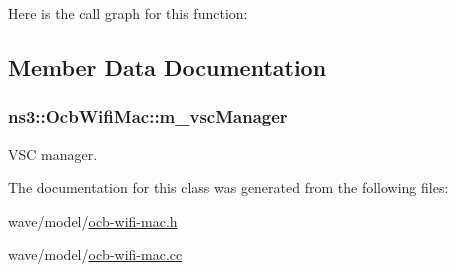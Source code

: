 Here is the call graph for this function\+:




\subsection{Member Data Documentation}
\subsubsection[{\texorpdfstring{m\+\_\+vsc\+Manager}{m_vscManager}}]{ ns3\+::\+Ocb\+Wifi\+Mac\+::m\+\_\+vsc\+Manager\hspace{0.3cm}{\ttfamily [private]}}\hypertarget{classns3_1_1OcbWifiMac_a6fa7d29070a49c08fb2297cba61b3a90}{}\label{classns3_1_1OcbWifiMac_a6fa7d29070a49c08fb2297cba61b3a90}


V\+SC manager. 



The documentation for this class was generated from the following files\+:\begin{DoxyCompactItemize}
\item 
wave/model/\hyperlink{ocb-wifi-mac_8h}{ocb-\/wifi-\/mac.\+h}\item 
wave/model/\hyperlink{ocb-wifi-mac_8cc}{ocb-\/wifi-\/mac.\+cc}\end{DoxyCompactItemize}
